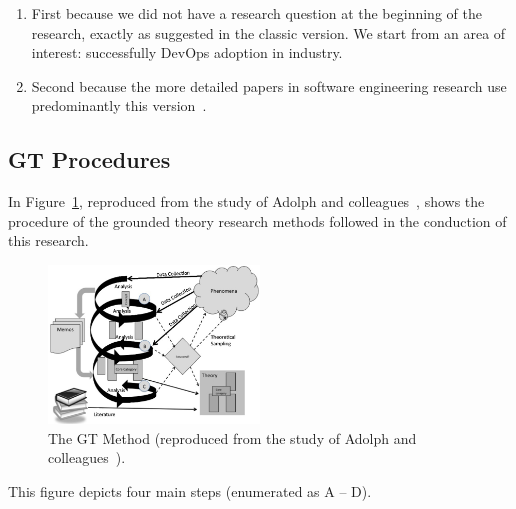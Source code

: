 \begin{enumerate}
\item First because we did not have a research
question at the beginning of the research, exactly as suggested in the classic
version. We start from an area of interest: successfully DevOps adoption
in industry.
\item Second because the more detailed papers in
software engineering research use predominantly this version~\cite{stol2016grounded}.
\end{enumerate}


\subsection{GT Procedures}

In Figure~\ref{fig1}, reproduced from the study of Adolph and colleagues~\cite{adolph2011using}, shows the procedure of the grounded theory research methods followed in the conduction of this
research.

\begin{figure}[htpb]
  \centering
  \includegraphics[width=0.5\textwidth,natwidth=821,natheight=617]{GT.png}
  \caption{The GT Method (reproduced from the study of Adolph and colleagues~\cite{adolph2011using}).}
  \label{fig1}
\end{figure}

This figure depicts four main steps (enumerated as A -- D).


